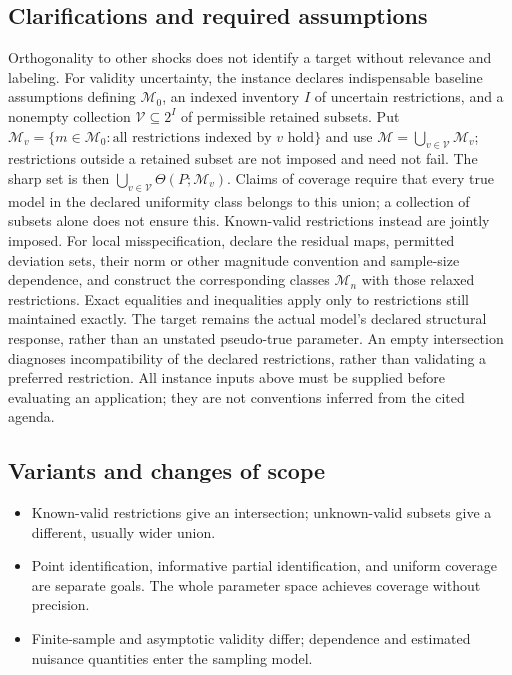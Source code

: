 \documentclass[11pt,a4paper]{article}
\begin{document}
\subsection*{Clarifications and required assumptions}

Orthogonality to other shocks does not identify a target without relevance and labeling. For validity uncertainty, the instance declares indispensable baseline assumptions defining \(\mathcal M_0\), an indexed inventory \(I\) of uncertain restrictions, and a nonempty collection \(\mathcal V\subseteq2^I\) of permissible retained subsets. Put \(\mathcal M_v=\{m\in\mathcal M_0:\text{all restrictions indexed by }v\text{ hold}\}\) and use \(\mathcal M=\bigcup_{v\in\mathcal V}\mathcal M_v\); restrictions outside a retained subset are not imposed and need not fail. The sharp set is then \(\bigcup_{v\in\mathcal V}\Theta(P;\mathcal M_v)\). Claims of coverage require that every true model in the declared uniformity class belongs to this union; a collection of subsets alone does not ensure this. Known-valid restrictions instead are jointly imposed. For local misspecification, declare the residual maps, permitted deviation sets, their norm or other magnitude convention and sample-size dependence, and construct the corresponding classes \(\mathcal M_n\) with those relaxed restrictions. Exact equalities and inequalities apply only to restrictions still maintained exactly. The target remains the actual model's declared structural response, rather than an unstated pseudo-true parameter. An empty intersection diagnoses incompatibility of the declared restrictions, rather than validating a preferred restriction. All instance inputs above must be supplied before evaluating an application; they are not conventions inferred from the cited agenda.

\subsection*{Variants and changes of scope}

\begin{itemize}
\item Known-valid restrictions give an intersection; unknown-valid subsets give a different, usually wider union.
\item Point identification, informative partial identification, and uniform coverage are separate goals. The whole parameter space achieves coverage without precision.
\item Finite-sample and asymptotic validity differ; dependence and estimated nuisance quantities enter the sampling model.
\end{itemize}
\end{document}
